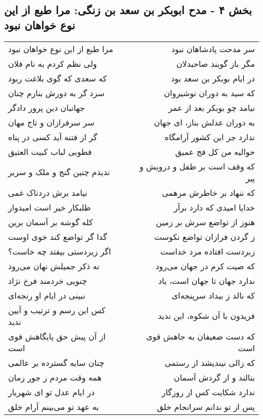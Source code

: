 \begin{center}
\section*{بخش ۴ - مدح ابوبکر بن سعد بن زنگی: مرا طبع از این نوع خواهان نبود}
\label{sec:004}
\begin{longtable}{l p{0.5cm} r}
مرا طبع از این نوع خواهان نبود
&&
سر مدحت پادشاهان نبود
\\
ولی نظم کردم به نام فلان
&&
مگر باز گویند صاحبدلان
\\
که سعدی که گوی بلاغت ربود
&&
در ایام بوبکر بن سعد بود
\\
سزد گر به دورش بنازم چنان
&&
که سید به دوران نوشیروان
\\
جهانبان دین پرور دادگر
&&
نیامد چو بوبکر بعد از عمر
\\
سر سرفرازان و تاج مهان
&&
به دوران عدلش بناز، ای جهان
\\
گر از فتنه آید کسی در پناه
&&
ندارد جز این کشور آرامگاه
\\
فطوبی لباب کبیت العتیق
&&
حوالیه من کل فج عمیق
\\
ندیدم چنین گنج و ملک و سریر
&&
که وقف است بر طفل و درویش و پیر
\\
نیامد برش دردناک غمی
&&
که ننهاد بر خاطرش مرهمی
\\
طلبکار خیر است امیدوار
&&
خدایا امیدی که دارد برآر
\\
کله گوشه بر آسمان برین
&&
هنوز از تواضع سرش بر زمین
\\
گدا گر تواضع کند خوی اوست
&&
ز گردن فرازان تواضع نکوست
\\
اگر زیردستی بیفتد چه خاست؟
&&
زبردست افتاده مرد خداست
\\
نه ذکر جمیلش نهان می‌رود
&&
که صیت کرم در جهان می‌رود
\\
چنویی خردمند فرخ نژاد
&&
ندارد جهان تا جهان است، یاد
\\
نبینی در ایام او رنجه‌ای
&&
که نالد ز بیداد سرپنجه‌ای
\\
کس این رسم و ترتیب و آیین ندید
&&
فریدون با آن شکوه، این ندید
\\
از آن پیش حق پایگاهش قوی است
&&
که دست ضعیفان به جاهش قوی است
\\
چنان سایه گسترده بر عالمی
&&
که زالی نیندیشد از رستمی
\\
همه وقت مردم ز جور زمان
&&
بنالند و از گردش آسمان
\\
در ایام عدل تو ای شهریار
&&
ندارد شکایت کس از روزگار
\\
به عهد تو می‌بینم آرام خلق
&&
پس از تو ندانم سرانجام خلق

\end{longtable}
\end{center}
